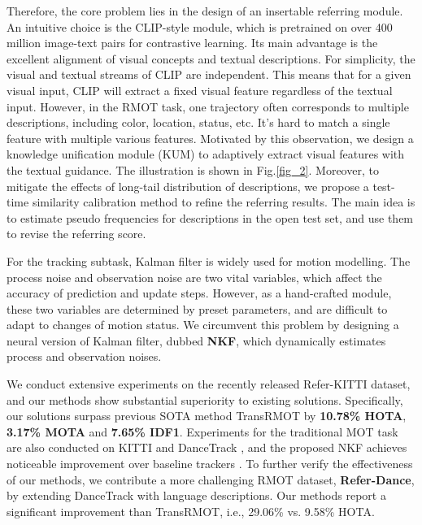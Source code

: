\documentclass[10pt,twocolumn,letterpaper]{article}
\begin{document}
    Therefore, the core problem lies in the design of an insertable referring module.
    An intuitive choice is the CLIP-style \cite{radford2021learning} module, which is pretrained on over 400 million image-text pairs for contrastive learning.
    Its main advantage is the excellent alignment of visual concepts and textual descriptions.
    For simplicity, the visual and textual streams of CLIP are independent.
    This means that for a given visual input, CLIP will extract a fixed visual feature regardless of the textual input.
    However, in the RMOT task, one trajectory often corresponds to multiple descriptions, including color, location, status, etc.
    It's hard to match a single feature with multiple various features.
    Motivated by this observation, we design a knowledge unification module (KUM) to adaptively extract visual features with the textual guidance.
    The illustration is shown in Fig.\ref{fig_2}.
    Moreover, to mitigate the effects of long-tail distribution of descriptions, we propose a test-time similarity calibration method to refine the referring results.
    The main idea is to estimate pseudo frequencies for descriptions in the open test set, and use them to revise the referring score.

    For the tracking subtask, Kalman filter \cite{kalman1960new} is widely used for motion modelling.
    The process noise and observation noise are two vital variables, which affect the accuracy of prediction and update steps.
    However, as a hand-crafted module, these two variables are determined by preset parameters, and are difficult to adapt to changes of motion status.
    We circumvent this problem by designing a neural version of Kalman filter, dubbed \textbf{NKF}, which dynamically estimates process and observation noises.

    We conduct extensive experiments on the recently released Refer-KITTI \cite{wu2023referring} dataset,
    and our methods show substantial superiority to existing solutions.
    Specifically, our solutions surpass previous SOTA method TransRMOT by \textbf{10.78\% HOTA}, \textbf{3.17\% MOTA} and \textbf{7.65\% IDF1}.
    Experiments for the traditional MOT task are also conducted on KITTI \cite{geiger2012we} and DanceTrack \cite{sun2022dancetrack},
    and the proposed NKF achieves noticeable improvement over baseline trackers \cite{wojke2017simple, zhang2022bytetrack}.
    To further verify the effectiveness of our methods, 
    we contribute a more challenging RMOT dataset, \textbf{Refer-Dance}, by extending DanceTrack with language descriptions.
    Our methods report a significant improvement than TransRMOT, i.e., 29.06\% vs. 9.58\% HOTA.
\end{document}
